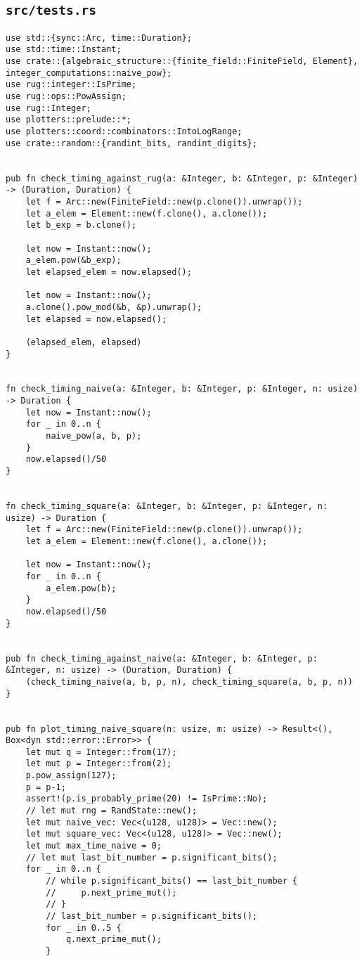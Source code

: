 \subsection{\texttt{src/tests.rs}}
\begin{verbatim}
use std::{sync::Arc, time::Duration};
use std::time::Instant;
use crate::{algebraic_structure::{finite_field::FiniteField, Element}, integer_computations::naive_pow};
use rug::integer::IsPrime;
use rug::ops::PowAssign;
use rug::Integer;
use plotters::prelude::*;
use plotters::coord::combinators::IntoLogRange;
use crate::random::{randint_bits, randint_digits};


pub fn check_timing_against_rug(a: &Integer, b: &Integer, p: &Integer) -> (Duration, Duration) {
    let f = Arc::new(FiniteField::new(p.clone()).unwrap());
    let a_elem = Element::new(f.clone(), a.clone());
    let b_exp = b.clone();

    let now = Instant::now();
    a_elem.pow(&b_exp);
    let elapsed_elem = now.elapsed();

    let now = Instant::now();
    a.clone().pow_mod(&b, &p).unwrap();
    let elapsed = now.elapsed();

    (elapsed_elem, elapsed)
}


fn check_timing_naive(a: &Integer, b: &Integer, p: &Integer, n: usize) -> Duration {
    let now = Instant::now();
    for _ in 0..n {
        naive_pow(a, b, p);
    }
    now.elapsed()/50
}


fn check_timing_square(a: &Integer, b: &Integer, p: &Integer, n: usize) -> Duration {
    let f = Arc::new(FiniteField::new(p.clone()).unwrap());
    let a_elem = Element::new(f.clone(), a.clone());
    
    let now = Instant::now();
    for _ in 0..n {
        a_elem.pow(b);
    }
    now.elapsed()/50
}


pub fn check_timing_against_naive(a: &Integer, b: &Integer, p: &Integer, n: usize) -> (Duration, Duration) {
    (check_timing_naive(a, b, p, n), check_timing_square(a, b, p, n))
}


pub fn plot_timing_naive_square(n: usize, m: usize) -> Result<(), Box<dyn std::error::Error>> {
    let mut q = Integer::from(17);
    let mut p = Integer::from(2);
    p.pow_assign(127);
    p = p-1;
    assert!(p.is_probably_prime(20) != IsPrime::No);
    // let mut rng = RandState::new();
    let mut naive_vec: Vec<(u128, u128)> = Vec::new();
    let mut square_vec: Vec<(u128, u128)> = Vec::new();
    let mut max_time_naive = 0;
    // let mut last_bit_number = p.significant_bits();
    for _ in 0..n {
        // while p.significant_bits() == last_bit_number {
        //     p.next_prime_mut();
        // }
        // last_bit_number = p.significant_bits();
        for _ in 0..5 {
            q.next_prime_mut();
        }


\end{verbatim}

